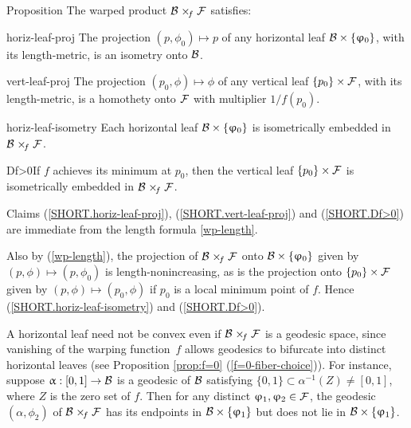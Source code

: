 \begin{thm}{Proposition}
The warped product $\spc{\spc{B}}\warp{f}\spc{F}$ satisfies:

\begin{subthm}{horiz-leaf-proj}
The projection $(p,\phi_0)\mapsto p$  of any  horizontal leaf $\spc{B}\times\{\phi_0\}$, with its length-metric,  is an isometry onto $\mathcal{B}$.
\end{subthm}

\begin{subthm}{vert-leaf-proj}
The projection $(p_0,\phi)\mapsto \phi$ of any  vertical leaf $\{p_0\}\times \spc{F}$, with its length-metric,  is a homothety onto $\mathcal{F}$ with multiplier $1/f(p_0)$.
\end{subthm}


\begin{subthm}{horiz-leaf-isometry}
Each horizontal leaf $\spc{B}\times\{\phi_0\}$ is isometrically embedded in $\spc{B}\warp{f}\spc{F}$.
\end{subthm}


\begin{subthm}{Df>0}If  $f$ achieves its minimum at $p_0$, then the vertical leaf $\{p_0\} \times \spc{F}$ is isometrically embedded in $\spc{B}\warp{f}\spc{F}$.
\end{subthm}

\end{thm}


Claims  (\ref{SHORT.horiz-leaf-proj}), (\ref{SHORT.vert-leaf-proj}) and (\ref{SHORT.Df>0})  are immediate from the 
length formula \ref{wp-length}.

Also by (\ref{wp-length}), the projection of
$\spc{B}\warp{f}\spc{F}$ onto $\spc{B}\times\{\phi_0\}$ given by  $(p,\phi)\mapsto (p,\phi_0)$   is length-nonincreasing, as is the projection onto $\{p_0\} \times \spc{F}$ given by  $(p,\phi)\mapsto (p_0,\phi)$  if $p_0$ is a local minimum point of $f$.  
Hence (\ref{SHORT.horiz-leaf-isometry}) and (\ref{SHORT.Df>0}).
\qeds



A horizontal leaf need not be convex even if $\spc{B}\warp{f}\spc{F}$ is a geodesic space, since vanishing of the warping function~$f$ allows geodesics to bifurcate into distinct horizontal leaves (see Proposition \ref{prop:f=0} (\ref{f=0-fiber-choice})).  For instance, suppose $\alpha:[0,1]\to \spc{B}$ is a geodesic of $\mathcal{B}$ satisfying $\{0,1\}\subset\alpha^{-1}(Z)\neq[0,1]$, where $Z$ is the zero set of $f$. Then for any distinct $\phi_1, \phi_2 \in \spc{F}$, the geodesic $(\alpha,\phi_2)$ of  $\spc{B} \warp{f}\spc{F}$ has its endpoints in $\spc{B}\times\{\phi_1\}$ but does not lie in $\spc{B}\times\{\phi_1\}$.

